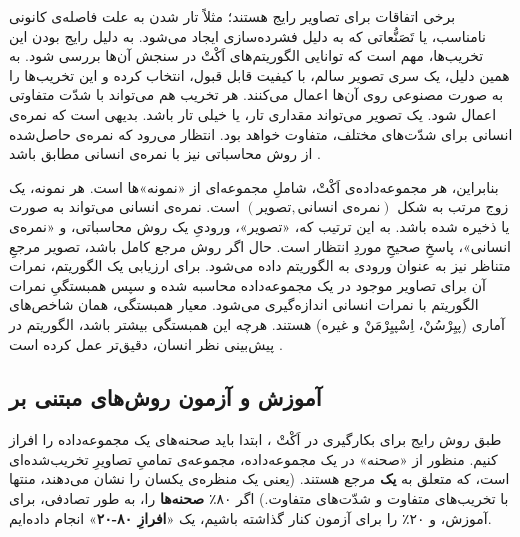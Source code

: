 \documentclass[twocolumn]{article}
\begin{document}
برخی اتفاقات برای تصاویر رایج هستند؛ مثلاً تار شدن به علت فاصله‌ی کانونی نامناسب، یا تَصَنُّعاتی که به دلیل فشرده‌سازی ایجاد می‌شود. به دلیل رایج بودن این تخریب‌ها، مهم است که توانایی الگوریتم‌های اَکْتْ در سنجش آن‌ها بررسی شود. به همین دلیل، یک سری تصویر سالم، با کیفیت قابل قبول، انتخاب کرده و این تخریب‌ها را به صورت مصنوعی روی آن‌ها اعمال می‌کنند. هر تخریب هم می‌تواند با شدّت متفاوتی اعمال شود. یک تصویر می‌تواند مقداری تار، یا خیلی تار باشد. بدیهی است که نمره‌ی انسانی برای شدّت‌های مختلف، متفاوت خواهد بود. انتظار می‌رود که نمره‌ی حاصل‌شده از روش محاسباتی نیز با نمره‌ی انسانی مطابق باشد \cite{chandler2013seven}.

بنابراین، هر مجموعه‌داده‌ی اَکْتْ، شاملِ مجموعه‌ای از «نمونه»ها است. هر نمونه، یک زوج مرتب به شکل $(\text{تصویر}, \text{نمره‌ی انسانی})$ است. نمره‌ی انسانی می‌تواند به صورت  یا  ذخیره شده باشد. به این ترتیب که، «تصویر»، ورودیِ یک روش محاسباتی، و «نمره‌ی انسانی»، پاسخِ صحیحِ موردِ انتظار است. حال اگر روش مرجع کامل باشد، تصویر مرجعِ متناظر نیز به عنوان ورودی به الگوریتم داده می‌شود. برای ارزیابی یک الگوریتم، نمرات آن برای تصاویر موجود در یک مجموعه‌داده محاسبه شده و سپس همبستگیِ نمرات الگوریتم با نمرات انسانی اندازه‌گیری می‌شود. معیار همبستگی، همان شاخص‌های آماری (پیِرْسُنْ، اِسْپیِرْمَنْ و غیره) هستند. هرچه این همبستگی بیشتر باشد، الگوریتم در پیش‌بینی نظر انسان، دقیق‌تر عمل کرده است \cite{sheikh2006statistical}.
\subsection{آموزش و آزمون روش‌های مبتنی بر } \label{sec:trainSVR}
طبق روش رایج برای بکارگیری  در اَکْتْ \cite{xue2014blind}، ابتدا باید صحنه‌های یک مجموعه‌داده را افراز کنیم. منظور از «صحنه» در یک مجموعه‌داده، مجموعه‌ی تمامیِ تصاویرِ تخریب‌شده‌ای است، که متعلق به \textbf{یک} مرجع هستند. (یعنی یک منظره‌ی یکسان را نشان می‌دهند، منتها با تخریب‌های متفاوت و شدّت‌های متفاوت.) اگر ۸۰٪ \textbf{صحنه‌ها} را، به طور تصادفی،  برای آموزش، و ۲۰٪ را برای آزمون کنار گذاشته باشیم، یک «\textbf{افرازِ ۸۰-۲۰}» انجام داده‌ایم.
\end{document}
